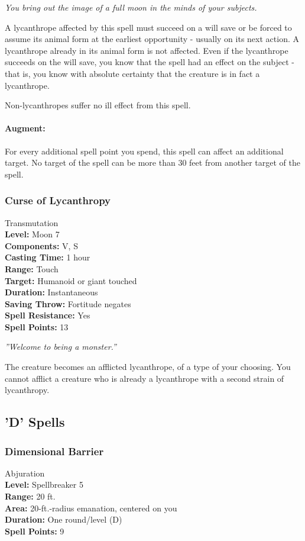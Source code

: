 \emph{You bring out the image of a full moon in the minds of your subjects.}

A lycanthrope affected by this spell must succeed on a will save or be forced to assume its animal form at the earliest opportunity - usually on its next action. A lycanthrope already in its animal form is not affected.
Even if the lycanthrope succeeds on the will save, you know that the spell had an effect on the subject - that is, you know with absolute certainty that the creature is in fact a lycanthrope.

Non-lycanthropes suffer no ill effect from this spell.
\paragraph{Augment:}
For every additional spell point you spend, this spell can affect an additional target.%
No target of the spell can be more than 30 feet from another target of the spell.

\subsubsection{Curse of Lycanthropy}
\label{Spell:CurseOfLycanthropy}
Transmutation
\\ \textbf{Level:} Moon 7
\\ \textbf{Components:} V, S
\\ \textbf{Casting Time:} 1 hour
\\ \textbf{Range:} Touch
\\ \textbf{Target:} Humanoid or giant touched
\\ \textbf{Duration:} Instantaneous
\\ \textbf{Saving Throw:} Fortitude negates
\\ \textbf{Spell Resistance:} Yes
\\ \textbf{Spell Points:} 13

\emph{''Welcome to being a monster.''}

The creature becomes an afflicted lycanthrope, of a type of your choosing. You cannot afflict a creature who is already a lycanthrope with a second strain of lycanthropy.
\subsection{'D' Spells}

\subsubsection{Dimensional Barrier}
\label{Spell:DimensionalBarrier}
Abjuration
\\ \textbf{Level:} Spellbreaker 5
\\ \textbf{Range:} 20 ft.
\\ \textbf{Area:} 20-ft.-radius emanation, centered on you
\\ \textbf{Duration:} One round/level (D)
\\ \textbf{Spell Points:} 9

